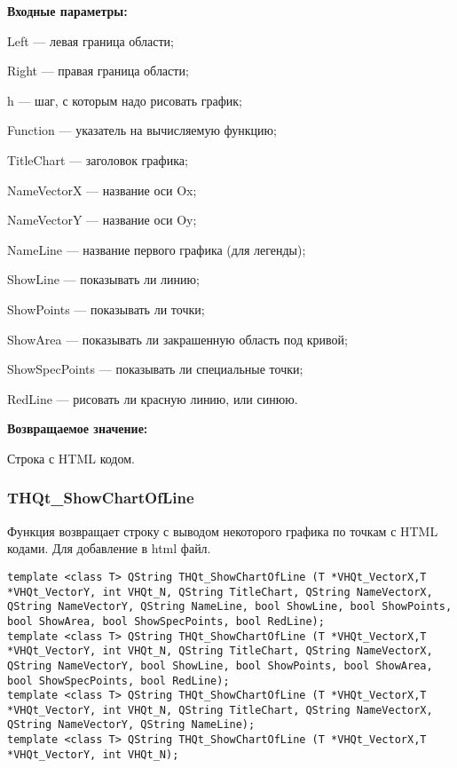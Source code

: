\documentclass[a4paper,12pt]{article}
\begin{document}
\textbf{Входные параметры:}
 
    Left --- левая граница области;
 
    Right --- правая граница области;
 
    h --- шаг, с которым надо рисовать график;
 
    Function --- указатель на вычисляемую функцию;
 
    TitleChart --- заголовок графика;
 
    NameVectorX --- название оси Ox;
 
    NameVectorY --- название оси Oy;
 
    NameLine --- название первого графика (для легенды);
 
    ShowLine --- показывать ли линию;
 
    ShowPoints --- показывать ли точки;
 
    ShowArea --- показывать ли закрашенную область под кривой;
 
    ShowSpecPoints --- показывать ли специальные точки;
 
    RedLine --- рисовать ли красную линию, или синюю.

\textbf{Возвращаемое значение:}

Строка с HTML кодом.


\subsubsection{THQt\_ShowChartOfLine}\label{THQt_ShowChartOfLine}

Функция возвращает строку с выводом некоторого графика по точкам с HTML кодами. Для добавление в html файл.


\begin{lstlisting}[label=code_syntax_THQt_ShowChartOfLine,caption=Синтаксис]
template <class T> QString THQt_ShowChartOfLine (T *VHQt_VectorX,T *VHQt_VectorY, int VHQt_N, QString TitleChart, QString NameVectorX, QString NameVectorY, QString NameLine, bool ShowLine, bool ShowPoints, bool ShowArea, bool ShowSpecPoints, bool RedLine);
template <class T> QString THQt_ShowChartOfLine (T *VHQt_VectorX,T *VHQt_VectorY, int VHQt_N, QString TitleChart, QString NameVectorX, QString NameVectorY, bool ShowLine, bool ShowPoints, bool ShowArea, bool ShowSpecPoints, bool RedLine);
template <class T> QString THQt_ShowChartOfLine (T *VHQt_VectorX,T *VHQt_VectorY, int VHQt_N, QString TitleChart, QString NameVectorX, QString NameVectorY, QString NameLine);
template <class T> QString THQt_ShowChartOfLine (T *VHQt_VectorX,T *VHQt_VectorY, int VHQt_N);
\end{lstlisting}
\end{document}
